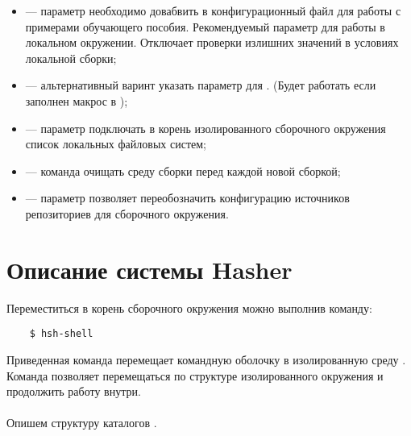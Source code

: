 \begin{itemize}
	\item {} ---  параметр необходимо  довабвить в конфигурационный
	файл для работы с примерами обучающего пособия. Рекомендуемый параметр для работы в локальном
	окружении. Отключает проверки излишних значений в условиях локальной сборки;
	\item {} --- альтернативный варинт указать параметр  для .
	(Будет работать если заполнен макрос   в );
	\item {} --- параметр подключать в корень изолированного сборочного
	окружения список локальных файловых систем;
	\item {} --- команда очищать среду сборки перед каждой новой сборкой;
	\item {} --- параметр позволяет переобозначить конфигурацию источников
	репозиториев для сборочного окружения.
\end{itemize}

\section{Описание системы Hasher}
Переместиться в корень сборочного окружения можно выполнив команду:
\begin{verbatim}
	$ hsh-shell
\end{verbatim}
Приведенная команда перемещает командную оболочку в изолированную среду .
Команда позволяет перемещаться по структуре изолированного окружения и продолжить работу
внутри.\\
\\
Опишем структуру каталогов .

